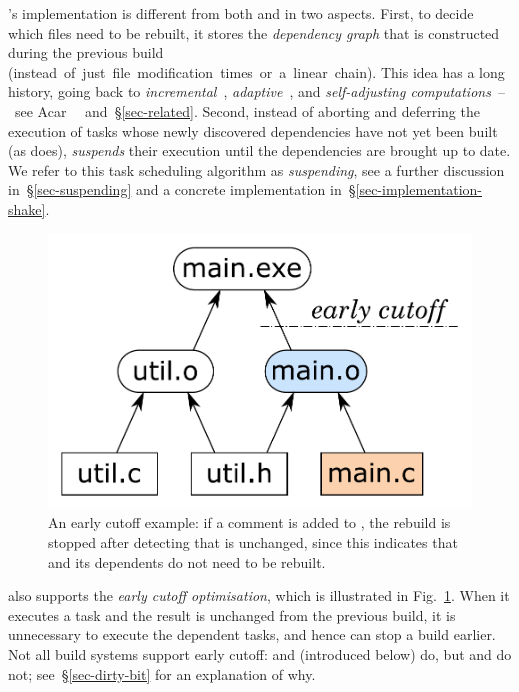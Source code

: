\Shake's implementation is different from both \Make and \Excel in two aspects.
First, to decide which files need to be rebuilt, it stores the \emph{dependency
graph} that is constructed during the previous build (\mbox{instead of
just file modification times or a linear chain}). This idea has a long history,
going back to \emph{incremental}~\cite{demers1981incremental},
\emph{adaptive}~\cite{acar2002adaptive}, and
\emph{self-adjusting computations}~--~see
Acar~\etal~ and~\S\ref{sec-related}. Second,
instead of aborting and deferring the execution of tasks whose newly discovered
dependencies have not yet been built (as \Excel does), \Shake \emph{suspends}
their execution until the dependencies are brought up to date. We refer to this
task scheduling algorithm as \emph{suspending}, see a further discussion
in~\S\ref{sec-suspending} and a concrete implementation
in~\S\ref{sec-implementation-shake}.

\begin{figure}
\centerline{\includegraphics[scale=0.28]{fig/shake-example-cutoff.pdf}}
\caption{An early cutoff example: if a comment is added to , the
rebuild is stopped after detecting that  is unchanged, since this
indicates that  and its dependents do not need to be
rebuilt.\label{fig-cutoff}}
\end{figure}

\Shake also supports the \emph{early cutoff optimisation}, which is illustrated
in Fig.~\ref{fig-cutoff}. When it executes a task and the result is unchanged
from the previous build, it is unnecessary to execute the dependent tasks, and
hence \Shake can stop a build earlier. Not all build systems support early
cutoff: \Shake and \Bazel (introduced below) do, but \Make and \Excel do not;
see~\S\ref{sec-dirty-bit} for an explanation of why.

